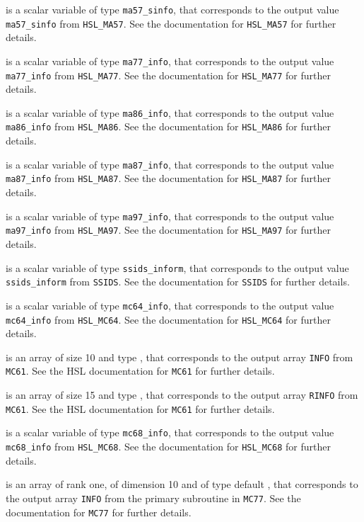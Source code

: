 \documentclass{galahad}
\begin{document}
\begin{description}
 is a scalar variable of type {\tt ma57\_sinfo},
that corresponds to the output value {\tt ma57\_sinfo}
from {\tt HSL\_MA57}. See the documentation for {\tt HSL\_MA57} for further
details.

 is a scalar variable of type {\tt ma77\_info},
that corresponds to the output value {\tt ma77\_info}
from {\tt HSL\_MA77}. See the documentation for {\tt HSL\_MA77} for further
details.

 is a scalar variable of type {\tt ma86\_info},
that corresponds to the output value {\tt ma86\_info}
from {\tt HSL\_MA86}. See the documentation for {\tt HSL\_MA86} for further
details.

 is a scalar variable of type {\tt ma87\_info},
that corresponds to the output value {\tt ma87\_info}
from {\tt HSL\_MA87}. See the documentation for {\tt HSL\_MA87} for further
details.

 is a scalar variable of type {\tt ma97\_info},
that corresponds to the output value {\tt ma97\_info}
from {\tt HSL\_MA97}. See the documentation for {\tt HSL\_MA97} for further
details.

 is a scalar variable of type {\tt ssids\_inform},
that corresponds to the output value {\tt ssids\_inform}
from {\tt SSIDS}. See the documentation for {\tt SSIDS} for further
details.

 is a scalar variable of type {\tt mc64\_info},
that corresponds to the output value {\tt mc64\_info}
from {\tt HSL\_MC64}. See the documentation for {\tt HSL\_MC64} for further
details.

 is an array of size 10 and type \integer,
that corresponds to the output array {\tt INFO}
from {\tt MC61}. See the HSL documentation for {\tt MC61} for further
details.

 is an array of size 15 and type \realdp,
that corresponds to the output array {\tt RINFO}
from {\tt MC61}. See the HSL documentation for {\tt MC61} for further
details.

 is a scalar variable of type {\tt mc68\_info},
that corresponds to the output value {\tt mc68\_info}
from {\tt HSL\_MC68}. See the documentation for {\tt HSL\_MC68} for further
details.

 is an array of rank one, of dimension 10 and of
type default \integer, that corresponds to the output array {\tt INFO}
from the primary subroutine in {\tt MC77}. See the documentation for
{\tt MC77} for further details.


\end{description}
\end{document}
